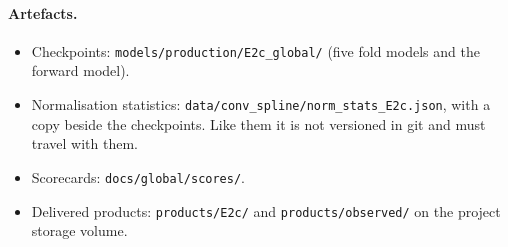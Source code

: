 \documentclass[11pt,a4paper]{article}
\newcommand{\code}[1]{\texttt{\small #1}}
\begin{document}
\paragraph{Artefacts.}
\begin{itemize}
\item Checkpoints: \code{models/production/E2c\_global/} (five fold models and the forward model).
\item Normalisation statistics: \code{data/conv\_spline/norm\_stats\_E2c.json}, with a copy beside
  the checkpoints. Like them it is not versioned in git and must travel with them.
\item Scorecards: \code{docs/global/scores/}.
\item Delivered products: \code{products/E2c/} and \code{products/observed/} on the project
  storage volume.
\end{itemize}
\end{document}
